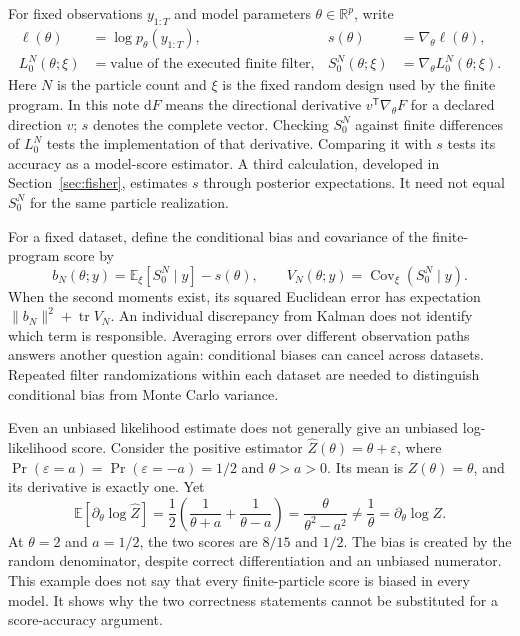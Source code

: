 \documentclass[11pt]{article}
\newcommand{\R}{\mathbb{R}}
\newcommand{\dd}{\mathrm{d}}
\begin{document}
For fixed observations $y_{1:T}$ and model parameters $\theta\in\R^p$, write
\begin{align}
 \ell(\theta)&=\log p_\theta(y_{1:T}), &
 s(\theta)&=\nabla_\theta\ell(\theta), \label{eq:exact-score}\\
 L_0^N(\theta;\xi)&=\text{value of the executed finite filter}, &
 S_0^N(\theta;\xi)&=\nabla_\theta L_0^N(\theta;\xi).
 \label{eq:finite-score}
\end{align}
Here $N$ is the particle count and $\xi$ is the fixed random design used by
the finite program. In this note $\dd F$ means the directional derivative
$v^\mathsf{T}\nabla_\theta F$ for a declared direction $v$; $s$ denotes the
complete vector. Checking $S_0^N$ against finite differences of $L_0^N$ tests
the implementation of that derivative. Comparing it with $s$ tests its
accuracy as a model-score estimator. A third calculation, developed in
Section~\ref{sec:fisher}, estimates $s$ through posterior expectations. It
need not equal $S_0^N$ for the same particle realization.

For a fixed dataset, define the conditional bias and covariance of the
finite-program score by
\begin{equation}
 b_N(\theta;y)=\mathbb E_\xi[S_0^N\mid y]-s(\theta),\qquad
 V_N(\theta;y)=\operatorname{Cov}_\xi(S_0^N\mid y).
 \label{eq:conditional-score-error}
\end{equation}
When the second moments exist, its squared Euclidean error has expectation
$\|b_N\|^2+\operatorname{tr}V_N$. An individual discrepancy from Kalman does
not identify which term is responsible. Averaging errors over different
observation paths answers another question again: conditional biases can
cancel across datasets. Repeated filter randomizations within each dataset
are needed to distinguish conditional bias from Monte Carlo variance.

Even an unbiased likelihood estimate does not generally give an unbiased
log-likelihood score. Consider the positive estimator
$\widehat Z(\theta)=\theta+\varepsilon$, where
$\Pr(\varepsilon=a)=\Pr(\varepsilon=-a)=1/2$ and $\theta>a>0$.
Its mean is $Z(\theta)=\theta$, and its derivative is exactly one. Yet
\begin{equation}
 \mathbb E\left[\partial_\theta\log\widehat Z\right]
 =\frac12\left(\frac1{\theta+a}+\frac1{\theta-a}\right)
 =\frac{\theta}{\theta^2-a^2}\ne\frac1\theta
 =\partial_\theta\log Z.
 \label{eq:unbiased-value-biased-score}
\end{equation}
At $\theta=2$ and $a=1/2$, the two scores are $8/15$ and $1/2$.
The bias is created by the random denominator, despite correct
differentiation and an unbiased numerator. This example does not say that
every finite-particle score is biased in every model. It shows why the two
correctness statements cannot be substituted for a score-accuracy argument.
\end{document}
